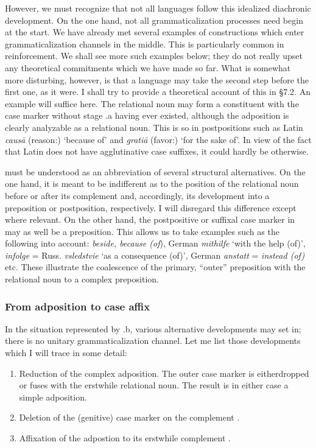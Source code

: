 However, we must recognize that not all languages follow this idealized diachronic development. On the one hand, not all grammaticalization processes need begin at the start. We have already met several examples of constructions which enter grammaticalization channels in the middle. This is particularly common in reinforcement. We shall see more such examples below; they do not really upset any theoretical commitments which we have made so far. What is somewhat more disturbing, however, is that a language may take the second step before the first one, as it were. I shall try to provide a theoretical account of this in §7.2. An example will suffice here. The relational noun may form a constituent with the case marker without stage .a having ever existed, although the adposition is clearly analyzable as a relational noun. This is so in postpositions such as Latin \textit{caus\=a} (reason:\glabl) ‘because of’ and \textit{grati\=a} (favor:\glabl) ‘for the sake of’. In view of the fact that Latin does not have agglutinative case suffixes, it could hardly be otherwise.

 must be understood as an abbreviation of several structural alternatives. On the one hand, it is meant to be indifferent as to the position of the relational noun before or after its complement and, accordingly, its development into a preposition or postposition, respectively. I will disregard this difference except where relevant. On the other hand, the postpositive or suffixal case marker in  may as well be a preposition. This allows us to take examples such as the following into account: \textit{beside, because (of}), German \textit{mithilfe} ‘with the help (of)’, \textit{infolge} = Russ. \textit{vsledstvie} ‘as a consequence (of)’, German \textit{anstatt} = \textit{instead (of)} etc. These illustrate the coalescence of the primary, “outer” preposition with the relational noun to a complex preposition.

\subsubsection{From adposition to case affix} \label{sec:3.4.1.3}
In the situation represented by .b, various alternative developments may set in; there is no unitary grammaticalization channel. Let me list those developments which I will trace in some detail:

\begin{enumerate}\enlargethispage{1\baselineskip}
\item Reduction of the complex adposition. The outer case marker is either\linebreak dropped or fuses with the erstwhile relational noun. The result is in either case a simple adposition.

\item Deletion of the (genitive) case marker on the complement \np.

\item Affixation of the adpostion to its erstwhile complement \np.
\end{enumerate}

